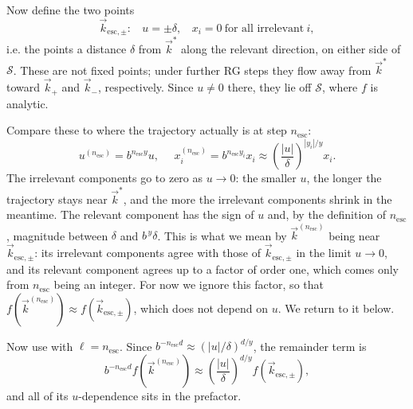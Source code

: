 Now define the two points
\begin{equation}\label{eq:kesc}
  \vec{k}_{\text{esc},\pm}:~~~~u=\pm\delta,~~~~x_i=0~\text{for all irrelevant}~i,
\end{equation}
i.e. the points a distance $\delta$ from $\vec{k}^*$ along the relevant
direction, on either side of $\mathcal{S}$. These are not fixed points; under
further RG steps they flow away from $\vec{k}^*$ toward $\vec{k}_+$ and
$\vec{k}_-$, respectively. Since $u\neq0$ there, they lie off $\mathcal{S}$,
where $f$ is analytic.

Compare these to where the trajectory actually is at step $n_\text{esc}$:
\begin{equation}
  u^{(n_\text{esc})}=b^{n_\text{esc}y}u,~~~~~~
  x_i^{(n_\text{esc})}=b^{n_\text{esc}y_i}x_i
  \approx\left(\frac{|u|}{\delta}\right)^{|y_i|/y}x_i.
\end{equation}
The irrelevant components go to zero as $u\to0$: the smaller $u$, the longer
the trajectory stays near $\vec{k}^*$, and the more the irrelevant components
shrink in the meantime. The relevant component has the sign of $u$ and, by the
definition of $n_\text{esc}$, magnitude between $\delta$ and $b^{\,y}\delta$.
This is what we mean by $\vec{k}^{(n_\text{esc})}$ being near
$\vec{k}_{\text{esc},\pm}$: its irrelevant components agree with those of
$\vec{k}_{\text{esc},\pm}$ in the limit $u\to0$, and its relevant component
agrees up to a factor of order one, which comes only from $n_\text{esc}$ being
an integer. For now we ignore this factor, so that
$f(\vec{k}^{(n_\text{esc})})\approx f(\vec{k}_{\text{esc},\pm})$, which does
not depend on $u$. We return to it below.

Now use  with $\ell=n_\text{esc}$. Since
$b^{-n_\text{esc}d}\approx(|u|/\delta)^{d/y}$, the remainder term is
\begin{equation}
  b^{-n_\text{esc}d}f\left(\vec{k}^{(n_\text{esc})}\right)
  \approx\left(\frac{|u|}{\delta}\right)^{d/y}f(\vec{k}_{\text{esc},\pm}),
\end{equation}
and all of its $u$-dependence sits in the prefactor.

